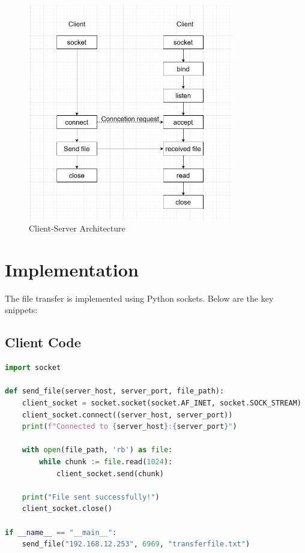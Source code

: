 \documentclass[12pt]{article}
\begin{document}
\begin{figure}[h]
    \centering
    \includegraphics[width=0.8\textwidth]{2.png}
    \caption{Client-Server Architecture}
    \label{fig:architecture}
\end{figure}

\section{Implementation}
The file transfer is implemented using Python sockets. Below are the key snippets:

\subsection{Client Code}
\begin{lstlisting}[language=Python, caption=Client code: send\_file()]
import socket

def send_file(server_host, server_port, file_path):
    client_socket = socket.socket(socket.AF_INET, socket.SOCK_STREAM)
    client_socket.connect((server_host, server_port))
    print(f"Connected to {server_host}:{server_port}")
    
    with open(file_path, 'rb') as file:
        while chunk := file.read(1024):
            client_socket.send(chunk)
    
    print("File sent successfully!")
    client_socket.close()

if __name__ == "__main__":
    send_file("192.168.12.253", 6969, "transferfile.txt")
\end{lstlisting}
\end{document}
